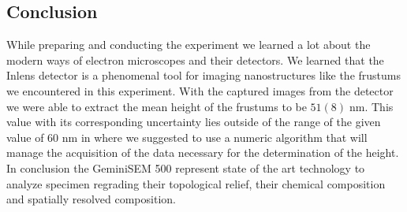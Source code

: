 \documentclass[a4paper,10pt,twocolumn]{article}
\begin{document}
\begin{extract*}

\section{Conclusion}
While preparing and conducting the experiment we learned a lot about the modern ways of electron microscopes and their detectors. We learned that the Inlens detector is a phenomenal tool for imaging nanostructures like the frustums we encountered in this experiment. With the captured images from the detector we were able to extract the mean height of the frustums to be $51(8)\;\mathrm{nm}$. This value with its corresponding uncertainty lies outside of the range of the given value of 60 nm in \cite{labdesc} where we suggested to use a numeric algorithm that will manage the acquisition of the data necessary for the determination of the height.\mypar
In conclusion the GeminiSEM 500 represent state of the art technology to analyze specimen regrading their topological relief, their chemical composition and spatially resolved composition.

\end{extract*}
\end{document}
